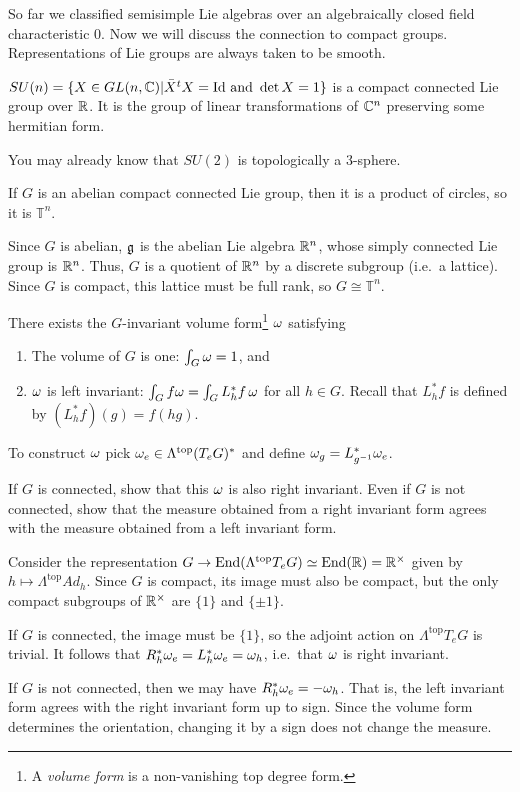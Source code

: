  So far we classified semisimple Lie algebras over an algebraically closed field
 characteristic 0. Now we will discuss the connection to compact groups.
 Representations of Lie groups are always taken to be smooth.
 \begin{example}
   $SU(n) = \{X\in GL(n,\mathbb{C})| \bar X^tX=\mathrm{Id} \text{ and } \det X=1\}$ is a compact
   connected Lie group over $\mathbb{R}$. It is the group of linear transformations of
   $\mathbb{C}^n$ preserving some hermitian form.

   You may already know that $SU(2)$ is topologically a 3-sphere.
 \end{example}
 \begin{exercise}
   If $G$ is an abelian compact connected Lie group, then it is a product of circles,
   so it is $\mathbb{T}^n$.
   \begin{solution}
     Since $G$ is abelian, $\mathfrak{g}$ is the abelian Lie algebra $\mathbb{R}^n$, whose simply
     connected Lie group is $\mathbb{R}^n$. Thus, $G$ is a quotient of $\mathbb{R}^n$ by a discrete
     subgroup (i.e.\ a lattice). Since $G$ is compact, this lattice must be full rank,
     so $G\cong \mathbb{T}^n$.
   \end{solution}
 \end{exercise}
 There exists the $G$-invariant volume form\footnote{A \emph{volume form} is a
 non-vanishing top degree form.} $\omega$ satisfying
 \begin{enumerate}
 \item The volume of $G$ is one: $\int_G \omega =1$, and \item $\omega$ is left invariant:
 $\int_G f \omega = \int_G L_h^* f\,\omega$ for all $h\in G$. Recall that $L_h^*f$ is defined
 by $(L_h^* f)(g) = f(hg)$.
 \end{enumerate}
 To construct $\omega$ pick $\omega_e\in \Lambda^\text{top} (T_eG)^*$ and define $\omega_g =
 L_{g^{-1}}^* \omega_e$.
 \begin{exercise}
   If $G$ is connected, show that this $\omega$ is also right invariant. Even if $G$ is
   not connected, show that the measure obtained from a right invariant form agrees
   with the measure obtained from a left invariant form.
   \begin{solution}
     Consider the representation $G\to \operatorname{End} (\Lambda^\text{top}T_eG)\simeq \operatorname{End}(\mathbb{R})=
     \mathbb{R}^\times$ given by $h\mapsto \Lambda^\text{top}Ad_h$. Since $G$ is compact, its
     image must also be compact, but the only compact subgroups of $\mathbb{R}^\times$ are
     $\{1\}$ and $\{\pm 1\}$.

     If $G$ is connected, the image must be $\{1\}$, so the adjoint action on
     $\Lambda^\text{top}T_eG$ is trivial. It follows that $R_h^* \omega_e =
     L_h^*\omega_e=\omega_h$, i.e.\ that $\omega$ is right invariant.

     If $G$ is not connected, then we may have $R_h^*\omega_e=-\omega_h$. That is, the left
     invariant form agrees with the right invariant form up to sign. Since the volume
     form determines the orientation, changing it by a sign does not change the
     measure.
   \end{solution}
 \end{exercise}
